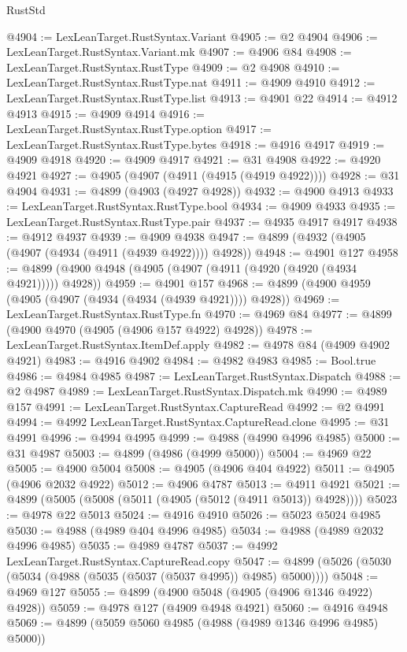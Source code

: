 \begin{lexlean}{RustStd}
\begin{coremodule}
@4904 := LexLeanTarget.RustSyntax.Variant
@4905 := @2 @4904
@4906 := LexLeanTarget.RustSyntax.Variant.mk
@4907 := @4906 @84
@4908 := LexLeanTarget.RustSyntax.RustType
@4909 := @2 @4908
@4910 := LexLeanTarget.RustSyntax.RustType.nat
@4911 := @4909 @4910
@4912 := LexLeanTarget.RustSyntax.RustType.list
@4913 := @4901 @22
@4914 := @4912 @4913
@4915 := @4909 @4914
@4916 := LexLeanTarget.RustSyntax.RustType.option
@4917 := LexLeanTarget.RustSyntax.RustType.bytes
@4918 := @4916 @4917
@4919 := @4909 @4918
@4920 := @4909 @4917
@4921 := @31 @4908
@4922 := @4920 @4921
@4927 := @4905 (@4907 (@4911 (@4915 (@4919 @4922))))
@4928 := @31 @4904
@4931 := @4899 (@4903 (@4927 @4928))
@4932 := @4900 @4913
@4933 := LexLeanTarget.RustSyntax.RustType.bool
@4934 := @4909 @4933
@4935 := LexLeanTarget.RustSyntax.RustType.pair
@4937 := @4935 @4917 @4917
@4938 := @4912 @4937
@4939 := @4909 @4938
@4947 := @4899 (@4932 (@4905 (@4907 (@4934 (@4911 (@4939 @4922)))) @4928))
@4948 := @4901 @127
@4958 := @4899 (@4900 @4948 (@4905 (@4907 (@4911 (@4920 (@4920 (@4934 @4921))))) @4928))
@4959 := @4901 @157
@4968 := @4899 (@4900 @4959 (@4905 (@4907 (@4934 (@4934 (@4939 @4921)))) @4928))
@4969 := LexLeanTarget.RustSyntax.RustType.fn
@4970 := @4969 @84
@4977 := @4899 (@4900 @4970 (@4905 (@4906 @157 @4922) @4928))
@4978 := LexLeanTarget.RustSyntax.ItemDef.apply
@4982 := @4978 @84 (@4909 @4902 @4921)
@4983 := @4916 @4902
@4984 := @4982 @4983
@4985 := Bool.true
@4986 := @4984 @4985
@4987 := LexLeanTarget.RustSyntax.Dispatch
@4988 := @2 @4987
@4989 := LexLeanTarget.RustSyntax.Dispatch.mk
@4990 := @4989 @157
@4991 := LexLeanTarget.RustSyntax.CaptureRead
@4992 := @2 @4991
@4994 := @4992 LexLeanTarget.RustSyntax.CaptureRead.clone
@4995 := @31 @4991
@4996 := @4994 @4995
@4999 := @4988 (@4990 @4996 @4985)
@5000 := @31 @4987
@5003 := @4899 (@4986 (@4999 @5000))
@5004 := @4969 @22
@5005 := @4900 @5004
@5008 := @4905 (@4906 @404 @4922)
@5011 := @4905 (@4906 @2032 @4922)
@5012 := @4906 @4787
@5013 := @4911 @4921
@5021 := @4899 (@5005 (@5008 (@5011 (@4905 (@5012 (@4911 @5013)) @4928))))
@5023 := @4978 @22 @5013
@5024 := @4916 @4910
@5026 := @5023 @5024 @4985
@5030 := @4988 (@4989 @404 @4996 @4985)
@5034 := @4988 (@4989 @2032 @4996 @4985)
@5035 := @4989 @4787
@5037 := @4992 LexLeanTarget.RustSyntax.CaptureRead.copy
@5047 := @4899 (@5026 (@5030 (@5034 (@4988 (@5035 (@5037 (@5037 @4995)) @4985) @5000))))
@5048 := @4969 @127
@5055 := @4899 (@4900 @5048 (@4905 (@4906 @1346 @4922) @4928))
@5059 := @4978 @127 (@4909 @4948 @4921)
@5060 := @4916 @4948
@5069 := @4899 (@5059 @5060 @4985 (@4988 (@4989 @1346 @4996 @4985) @5000))

\end{coremodule}
\end{lexlean}
